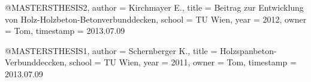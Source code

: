 @MASTERSTHESIS{2,
  author = {Kirchmayer E.},
  title = {Beitrag zur Entwicklung von Holz-Holzbeton-Betonverbunddecken},
  school = {TU Wien},
  year = {2012},
  owner = {Tom},
  timestamp = {2013.07.09}
}

@MASTERSTHESIS{1,
  author = {Schernberger K.},
  title = {Holzspanbeton-Verbunddeccken},
  school = {TU Wien},
  year = {2011},
  owner = {Tom},
  timestamp = {2013.07.09}
}
